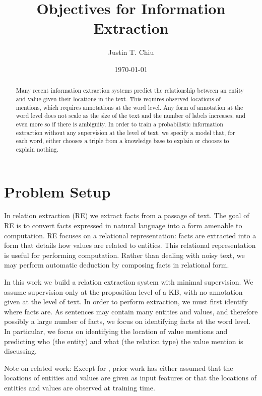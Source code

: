 \documentclass[12pt]{article}
\title{Objectives for Information Extraction}
\author{
Justin T. Chiu
}
\date{\today}
\begin{document}
\maketitle

\begin{abstract}
Many recent information extraction systems predict the relationship between an entity and value given
their locations in the text.
This requires observed locations of mentions, which requires annotations at the word level.
Any form of annotation at the word level does not scale as the size of the text
and the number of labels increases, and even more so if there is ambiguity.
In order to train a probabilistic information extraction without any
supervision at the level of text, we specify a model 
that, for each word, either chooses a triple from a knowledge base to explain
or chooses to explain nothing.
\end{abstract}

\section{Problem Setup}

In relation extraction (RE) we extract facts from a passage of text.
The goal of RE is to convert facts expressed in natural language into a form
amenable to computation.
RE focuses on a relational representation: facts are extracted into a form that details
how values are related to entities.
This relational representation is useful for performing computation.
Rather than dealing with noisy text, we may perform automatic deduction by composing facts 
in relational form.

In this work we build a relation extraction system with minimal supervision.
We assume supervision only at the proposition level of a KB,
with no annotation given at the level of text.
In order to perform extraction, we must first identify where facts are.
As sentences may contain many entities and values, and therefore possibly
a large number of facts, we focus on identifying facts at the word level.
In particular, we focus on identifying the location of value mentions
and predicting who (the entity) and what (the relation type) the value mention
is discussing.

Note on related work:
Except for \citet{zeng2018copy}, prior work has either assumed that the locations of
entities and values are given as input features or that the locations of entities and values
are observed at training time.
\end{document}
